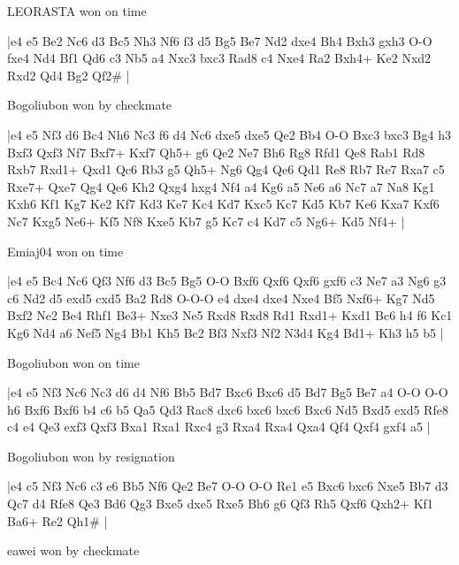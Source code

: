 \showboard

LEORASTA won on time

\makegametitle
|e4 e5 Be2 Nc6 d3 Bc5 Nh3 Nf6 f3 d5 Bg5 Be7 Nd2 dxe4 Bh4 Bxh3 gxh3 O-O fxe4 Nd4 Bf1 Qd6 c3 Nb5 a4 Nxc3 bxc3 Rad8 c4 Nxe4 Ra2 Bxh4+ Ke2 Nxd2 Rxd2 Qd4 Bg2 Qf2\#  |

\showboard

Bogoliubon won by checkmate

\makegametitle
|e4 e5 Nf3 d6 Bc4 Nh6 Nc3 f6 d4 Nc6 dxe5 dxe5 Qe2 Bb4 O-O Bxc3 bxc3 Bg4 h3 Bxf3 Qxf3 Nf7 Bxf7+ Kxf7 Qh5+ g6 Qe2 Ne7 Bh6 Rg8 Rfd1 Qe8 Rab1 Rd8 Rxb7 Rxd1+ Qxd1 Qc6 Rb3 g5 Qh5+ Ng6 Qg4 Qe6 Qd1 Re8 Rb7 Re7 Rxa7 c5 Rxe7+ Qxe7 Qg4 Qe6 Kh2 Qxg4 hxg4 Nf4 a4 Kg6 a5 Ne6 a6 Nc7 a7 Na8 Kg1 Kxh6 Kf1 Kg7 Ke2 Kf7 Kd3 Ke7 Kc4 Kd7 Kxc5 Kc7 Kd5 Kb7 Ke6 Kxa7 Kxf6 Nc7 Kxg5 Ne6+ Kf5 Nf8 Kxe5 Kb7 g5 Kc7 c4 Kd7 c5 Ng6+ Kd5 Nf4+  |

\showboard

Emiaj04 won on time

\makegametitle
|e4 e5 Bc4 Nc6 Qf3 Nf6 d3 Bc5 Bg5 O-O Bxf6 Qxf6 Qxf6 gxf6 c3 Ne7 a3 Ng6 g3 c6 Nd2 d5 exd5 cxd5 Ba2 Rd8 O-O-O e4 dxe4 dxe4 Nxe4 Bf5 Nxf6+ Kg7 Nd5 Bxf2 Ne2 Be4 Rhf1 Be3+ Nxe3 Ne5 Rxd8 Rxd8 Rd1 Rxd1+ Kxd1 Bc6 h4 f6 Kc1 Kg6 Nd4 a6 Nef5 Ng4 Bb1 Kh5 Bc2 Bf3 Nxf3 Nf2 N3d4 Kg4 Bd1+ Kh3 h5 b5  |

\showboard

Bogoliubon won on time

\makegametitle
|e4 e5 Nf3 Nc6 Nc3 d6 d4 Nf6 Bb5 Bd7 Bxc6 Bxc6 d5 Bd7 Bg5 Be7 a4 O-O O-O h6 Bxf6 Bxf6 b4 c6 b5 Qa5 Qd3 Rac8 dxc6 bxc6 bxc6 Bxc6 Nd5 Bxd5 exd5 Rfe8 c4 e4 Qe3 exf3 Qxf3 Bxa1 Rxa1 Rxc4 g3 Rxa4 Rxa4 Qxa4 Qf4 Qxf4 gxf4 a5  |

\showboard

Bogoliubon won by resignation

\makegametitle
|e4 c5 Nf3 Nc6 c3 e6 Bb5 Nf6 Qe2 Be7 O-O O-O Re1 e5 Bxc6 bxc6 Nxe5 Bb7 d3 Qc7 d4 Rfe8 Qe3 Bd6 Qg3 Bxe5 dxe5 Rxe5 Bh6 g6 Qf3 Rh5 Qxf6 Qxh2+ Kf1 Ba6+ Re2 Qh1\#  |

\showboard

eawei won by checkmate

